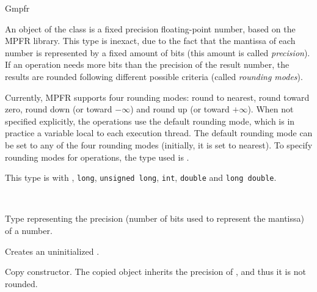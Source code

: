 \begin{ccRefClass} {Gmpfr}
\label{Gmpfr}

\ccDefinition

An object of the class  is a fixed precision floating-point
number, based on the MPFR library. This type is inexact, due to the fact
that the mantissa of each number is represented by a fixed amount of bits
(this amount is called \emph{precision}). If an operation needs more bits
than the precision of the result number, the results are rounded following
different possible criteria (called \emph{rounding modes}).

Currently, MPFR supports four rounding modes: round to nearest,
round toward zero, round down (or toward \(-\infty\)) and round up
(or toward \(+\infty\)).  When not specified explicitly, the
operations use the default rounding mode, which is in practice a
variable local to each execution thread. The default rounding mode
can be set to any of the four rounding modes (initially, it is set
to nearest). To specify rounding modes for operations, the type
used is .

This type is  with , \verb-long-,
\verb-unsigned long-, \verb-int-, \verb-double- and \verb-long double-.


\ccIsModel
{}\\

\ccTypes

                {Type representing the precision (number of bits
                used to represent the mantissa) of a number.}

\ccCreation
{}

        {Creates an uninitialized  \ccVar.}

        {Copy constructor. The copied object inherits the precision of
        , and thus it is not rounded.}



\end{ccRefClass}
